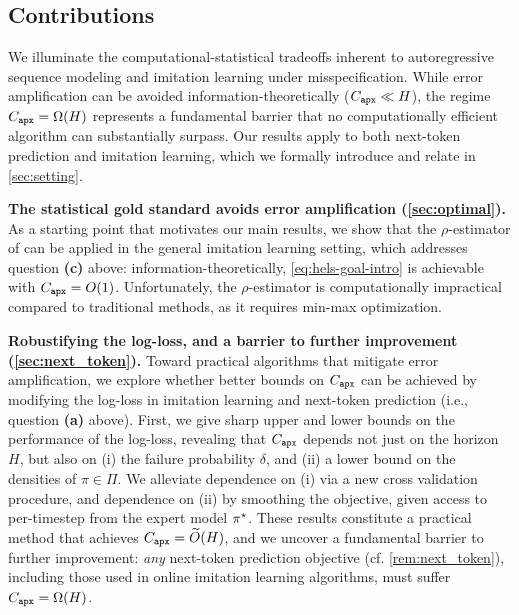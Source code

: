 \subsection{Contributions}

We illuminate
the computational-statistical tradeoffs inherent to autoregressive
sequence modeling and imitation learning under misspecification. While error
amplification can be avoided information-theoretically
($C_{\texttt{apx}}\ll{}H$), the regime $C_{\texttt{apx}}=\Omega(H)$ represents a fundamental barrier that no computationally efficient algorithm
can substantially surpass.
Our results apply to both next-token prediction and imitation learning, which we formally introduce and relate in \cref{sec:setting}. %
\loose


\vspace{0.3em}
\noindent\textbf{The statistical gold standard avoids error amplification (\cref{sec:optimal}).}
As a starting point that motivates our main
results, we show that the $\rho$-estimator of \cite{baraud2017new,baraud2018rho} can be applied in the general imitation
learning setting, which addresses question \textbf{(c)} above: information-theoretically,
\cref{eq:hels-goal-intro} is achievable with
$C_{\texttt{apx}}=O(1)$. %
Unfortunately,
the $\rho$-estimator is computationally impractical compared to traditional methods, as it requires min-max optimization.\loose




\vspace{0.3em}
\noindent\textbf{Robustifying the log-loss, and a barrier to further improvement (\cref{sec:next_token}).}
Toward practical algorithms that mitigate error amplification,
we explore whether better bounds on $C_{\texttt{apx}}$ can be achieved by
modifying the log-loss in imitation learning and next-token prediction (i.e., question \textbf{(a)} above).
First, we give sharp upper and lower bounds on the performance of
the log-loss, revealing that $C_{\texttt{apx}}$ depends not just on the horizon $H$, but also on (i) the failure
probability $\delta$, and (ii) a lower bound on the densities of $\pi\in\Pi$. 
We alleviate dependence on (i) via a new cross validation procedure, and dependence on (ii) by smoothing the objective, 
given access to per-timestep \emph{\densobs} from the expert model $\pi^{\star}$.
These results constitute a practical method that achieves $C_{\texttt{apx}}=\widetilde{O}(H)$, and we uncover a fundamental barrier to further
improvement: \emph{any} next-token
prediction objective (cf. \cref{rem:next_token}), including those used in online imitation learning algorithms, 
must suffer $C_{\texttt{apx}} = \Omega(H)$.\loose







